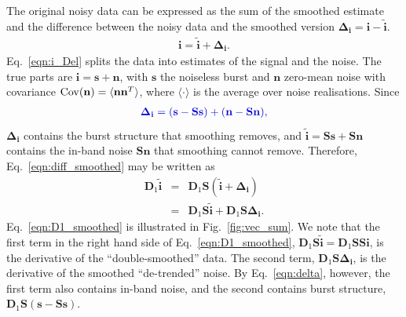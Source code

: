 \documentclass[twocolumn]{aastex631}
\providecommand{\DIFadd}[1]{{\protect\color{BLUE}#1}} %
\providecommand{\DIFaddbegin}{} \providecommand{\DIFaddend}{} %
\newcommand{\DIFaddincludegraphics}[2][]{{\color{blue}\fbox{\DIFOincludegraphics[#1]{#2}}}} %
\DeclareRobustCommand{\DIFaddbegin}{\DIFOaddbegin \let\includegraphics\DIFaddincludegraphics} %
\DeclareRobustCommand{\DIFaddend}{\DIFOaddend \let\includegraphics\DIFOincludegraphics} %
\begin{document}
The original noisy data can be expressed as the sum of the smoothed estimate and the difference between the noisy data and the smoothed version $\mathbf{\Delta_i}=\mathbf{i}-\tilde{\mathbf{i}}$. 
\begin{eqnarray}
\mathbf{i}=\tilde{\mathbf{i}}+\mathbf{\Delta_i}.
\label{eqn:i_Del}
\end{eqnarray}
\DIFaddbegin \DIFadd{Eq.~\eqref{eqn:i_Del} splits the data into estimates of the signal and the noise. The true parts are $\mathbf{i}=\mathbf{s}+\mathbf{n}$, with $\mathbf{s}$ the noiseless burst and $\mathbf{n}$ zero-mean noise with covariance ${\rm Cov}(\mathbf{n})=\langle\mathbf{n}\mathbf{n}^T\rangle$, where $\langle\cdot\rangle$ is the average over noise realisations. Since
}\begin{eqnarray}
\DIFadd{\mathbf{\Delta_i}=(\mathbf{s}-\mathbf{S}\mathbf{s})+(\mathbf{n}-\mathbf{S}\mathbf{n}),
\label{eqn:delta}
}\end{eqnarray}
\DIFadd{$\mathbf{\Delta_i}$ contains the burst structure that smoothing removes, and $\tilde{\mathbf{i}}=\mathbf{S}\mathbf{s}+\mathbf{S}\mathbf{n}$ contains the in-band noise $\mathbf{S}\mathbf{n}$ that smoothing cannot remove.
}\DIFaddend Therefore, Eq.~\eqref{eqn:diff_smoothed} may be written as
\begin{eqnarray}
\mathbf{D}_1\tilde{\mathbf{i}}&=&\mathbf{D}_1\mathbf{S}(\tilde{\mathbf{i}}+\mathbf{\Delta_i})\nonumber\\
&=&\mathbf{D}_1\mathbf{S}\tilde{\mathbf{i}}+\mathbf{D}_1\mathbf{S}\mathbf{\Delta_i}.
\label{eqn:D1_smoothed}
\end{eqnarray}
Eq.~\eqref{eqn:D1_smoothed} is illustrated in Fig.~\ref{fig:vec_sum}. We note that the first term in the right hand side of Eq.~\eqref{eqn:D1_smoothed}, $\mathbf{D}_1\mathbf{S}\tilde{\mathbf{i}}=\mathbf{D}_1\mathbf{S}\mathbf{S}\mathbf{i}$, is the derivative of the ``double-smoothed'' data. The second term, $\mathbf{D}_1\mathbf{S}\mathbf{\Delta_i}$, is the derivative of the smoothed ``de-trended'' noise. \DIFaddbegin \DIFadd{By Eq.~\eqref{eqn:delta}, however, the first term also contains in-band noise, and the second contains burst structure, $\mathbf{D}_1\mathbf{S}(\mathbf{s}-\mathbf{S}\mathbf{s})$. 
}\DIFaddend 
\end{document}
